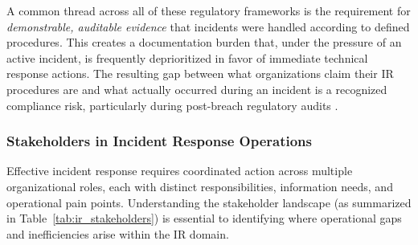 A common thread across all of these regulatory frameworks is the requirement for \textit{demonstrable, auditable evidence} that incidents were handled according to defined procedures.
This creates a documentation burden that, under the pressure of an active incident, is frequently deprioritized in favor of immediate technical response actions.
The resulting gap between what organizations claim their IR procedures are and what actually occurred during an incident is a recognized compliance risk, particularly during post-breach regulatory audits \citep{isaca2021}.

\subsubsection{Stakeholders in Incident Response Operations}

Effective incident response requires coordinated action across multiple organizational roles, each with distinct responsibilities, information needs, and operational pain points.
Understanding the stakeholder landscape (as summarized in Table~\ref{tab:ir_stakeholders}) is essential to identifying where operational gaps and inefficiencies arise within the IR domain.

